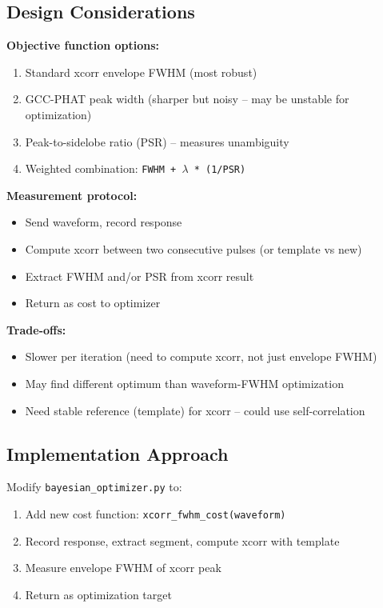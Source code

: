 \documentclass[11pt]{article}
\begin{document}
\subsection{Design Considerations}
\textbf{Objective function options:}
\begin{enumerate}
    \item Standard xcorr envelope FWHM (most robust)
    \item GCC-PHAT peak width (sharper but noisy -- may be unstable for optimization)
    \item Peak-to-sidelobe ratio (PSR) -- measures unambiguity
    \item Weighted combination: \texttt{FWHM + $\lambda$ * (1/PSR)}
\end{enumerate}

\textbf{Measurement protocol:}
\begin{itemize}
    \item Send waveform, record response
    \item Compute xcorr between two consecutive pulses (or template vs new)
    \item Extract FWHM and/or PSR from xcorr result
    \item Return as cost to optimizer
\end{itemize}

\textbf{Trade-offs:}
\begin{itemize}
    \item Slower per iteration (need to compute xcorr, not just envelope FWHM)
    \item May find different optimum than waveform-FWHM optimization
    \item Need stable reference (template) for xcorr -- could use self-correlation
\end{itemize}

\subsection{Implementation Approach}
Modify \texttt{bayesian\_optimizer.py} to:
\begin{enumerate}
    \item Add new cost function: \texttt{xcorr\_fwhm\_cost(waveform)}
    \item Record response, extract segment, compute xcorr with template
    \item Measure envelope FWHM of xcorr peak
    \item Return as optimization target
\end{enumerate}
\end{document}
